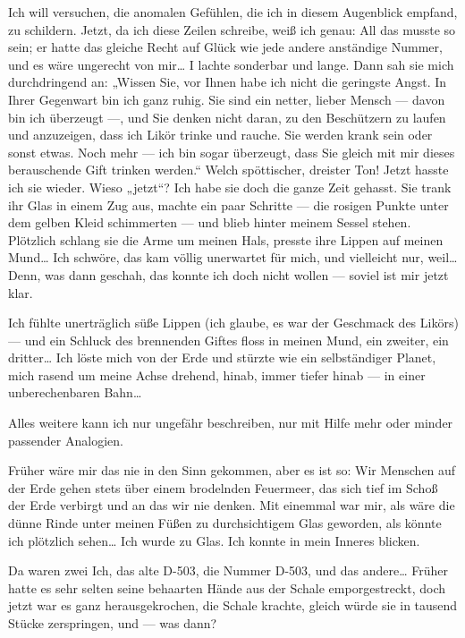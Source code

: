 Ich will versuchen, die anomalen Gefühlen, die ich in diesem
Augenblick empfand, zu schildern. Jetzt, da ich diese Zeilen
schreibe, weiß ich genau: All das musste so sein; er hatte das
gleiche Recht auf Glück wie jede andere anständige Nummer, und es
wäre ungerecht von mir\ldots{} I lachte sonderbar und lange. Dann sah
sie mich durchdringend an: „Wissen Sie, vor Ihnen habe ich nicht
die geringste Angst. In Ihrer Gegenwart bin ich ganz ruhig. Sie
sind ein netter, lieber Mensch — davon bin ich überzeugt —, und Sie
denken nicht daran, zu den Beschützern zu laufen und anzuzeigen,
dass ich Likör trinke und rauche. Sie werden krank sein oder sonst
etwas. Noch mehr — ich bin sogar überzeugt, dass Sie gleich mit mir
dieses berauschende Gift trinken werden.“ Welch spöttischer,
dreister Ton! Jetzt hasste ich sie wieder. Wieso „jetzt“? Ich habe
sie doch die ganze Zeit gehasst. Sie trank ihr Glas in einem Zug
aus, machte ein paar Schritte — die rosigen Punkte unter dem gelben
Kleid schimmerten — und blieb hinter meinem Sessel stehen.
Plötzlich schlang sie die Arme um meinen Hals, presste ihre Lippen
auf meinen Mund\ldots{} Ich schwöre, das kam völlig unerwartet für mich,
und vielleicht nur, weil\ldots{} Denn, was dann geschah, das konnte ich
doch nicht wollen — soviel ist mir jetzt klar.

Ich fühlte unerträglich süße Lippen (ich glaube, es war der
Geschmack des Likörs) — und ein Schluck des brennenden Giftes floss
in meinen Mund, ein zweiter, ein dritter\ldots{} Ich löste mich von der
Erde und stürzte wie ein selbständiger Planet, mich rasend um meine
Achse drehend, hinab, immer tiefer hinab — in einer unberechenbaren
Bahn\ldots{}

Alles weitere kann ich nur ungefähr beschreiben, nur mit Hilfe mehr
oder minder passender Analogien.

Früher wäre mir das nie in den Sinn gekommen, aber es ist so: Wir
Menschen auf der Erde gehen stets über einem brodelnden Feuermeer,
das sich tief im Schoß der Erde verbirgt und an das wir nie denken.
Mit einemmal war mir, als wäre die dünne Rinde unter meinen Füßen
zu durchsichtigem Glas geworden, als könnte ich plötzlich sehen\ldots{}
Ich wurde zu Glas. Ich konnte in mein Inneres blicken.

Da waren zwei Ich, das alte D-503, die Nummer D-503, und das
andere\ldots{} Früher hatte es sehr selten seine behaarten Hände aus der
Schale emporgestreckt, doch jetzt war es ganz herausgekrochen, die
Schale krachte, gleich würde sie in tausend Stücke zerspringen, und
— was dann?

